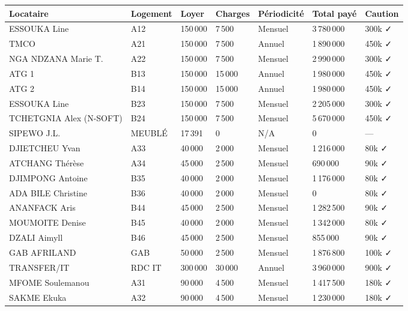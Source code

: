 \documentclass[a4paper,11pt]{article}
\begin{document}
\begin{longtable}{|p{3.5cm}|p{2.5cm}|p{1.5cm}|p{1.5cm}|p{2cm}|p{2cm}|p{2cm}|}
\hline
\textbf{Locataire} & \textbf{Logement} & \textbf{Loyer} & \textbf{Charges} & \textbf{Périodicité} & \textbf{Total payé} & \textbf{Caution} \\
\hline
\endhead
ESSOUKA Line & A12 & 150\,000 & 7\,500 & Mensuel & 3\,780\,000 & 300k ✓ \\
\hline
TMCO & A21 & 150\,000 & 7\,500 & Annuel & 1\,890\,000 & 450k ✓ \\
\hline
NGA NDZANA Marie T. & A22 & 150\,000 & 7\,500 & Mensuel & 2\,990\,000 & 300k ✓ \\
\hline
ATG 1 & B13 & 150\,000 & 15\,000 & Annuel & 1\,980\,000 & 450k ✓ \\
\hline
ATG 2 & B14 & 150\,000 & 15\,000 & Annuel & 1\,980\,000 & 450k ✓ \\
\hline
ESSOUKA Line & B23 & 150\,000 & 7\,500 & Mensuel & 2\,205\,000 & 300k ✓ \\
\hline
TCHETGNIA Alex (N-SOFT) & B24 & 150\,000 & 7\,500 & Mensuel & 5\,670\,000 & 450k ✓ \\
\hline
SIPEWO J.L. & MEUBLÉ & 17\,391 & 0 & N/A & 0 & — \\
\hline
DJIETCHEU Yvan & A33 & 40\,000 & 2\,000 & Mensuel & 1\,216\,000 & 80k ✓ \\
\hline
ATCHANG Thérèse & A34 & 45\,000 & 2\,500 & Mensuel & 690\,000 & 90k ✓ \\
\hline
DJIMPONG Antoine & B35 & 40\,000 & 2\,000 & Mensuel & 1\,176\,000 & 80k ✓ \\
\hline
ADA BILE Christine & B36 & 40\,000 & 2\,000 & Mensuel & 0 & 80k ✓ \\
\hline
ANANFACK Aris & B44 & 45\,000 & 2\,500 & Mensuel & 1\,282\,500 & 90k ✓ \\
\hline
MOUMOITE Denise & B45 & 40\,000 & 2\,000 & Mensuel & 1\,342\,000 & 80k ✓ \\
\hline
DZALI Aimyll & B46 & 45\,000 & 2\,500 & Mensuel & 855\,000 & 90k ✓ \\
\hline
GAB AFRILAND & GAB & 50\,000 & 2\,500 & Mensuel & 1\,876\,800 & 100k ✓ \\
\hline
TRANSFER/IT & RDC IT & 300\,000 & 30\,000 & Annuel & 3\,960\,000 & 900k ✓ \\
\hline
MFOME Soulemanou & A31 & 90\,000 & 4\,500 & Mensuel & 1\,417\,500 & 180k ✓ \\
\hline
SAKME Ekuka & A32 & 90\,000 & 4\,500 & Mensuel & 1\,230\,000 & 180k ✓ \\
\hline

\end{longtable}
\end{document}
